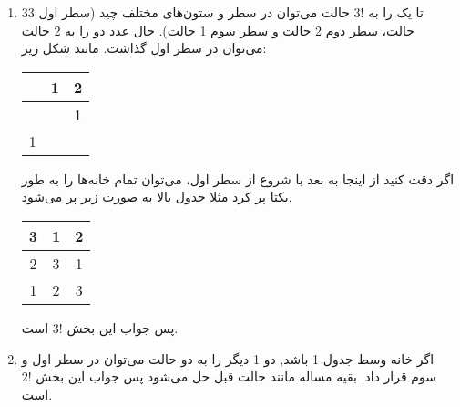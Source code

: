 \begin{enumerate}
    \item
        3تا یک را به 
	$3!$
	حالت می‌توان در سطر و ستون‌های مختلف چید
	(سطر اول 3 حالت، سطر دوم 2 حالت و سطر سوم 1 حالت).
	حال عدد دو را به 2 حالت می‌توان در سطر اول گذاشت. مانند شکل زیر:
	
	 \begin{center}
	\begin{tabular}{ |c|c|c| } 
     \hline
       & 1 & 2  \\ 
     \hline
       &   & 1 \\ 
     \hline
     1 &  &   \\ 
     \hline
    \end{tabular}
    \end{center}
    اگر دقت کنید از اینجا به بعد با شروع از سطر اول، می‌توان تمام خانه‌ها را به طور یکتا پر کرد مثلا جدول بالا به صورت زیر پر می‌شود.
    
    \begin{center}
	\begin{tabular}{ |c|c|c| } 
     \hline
      3 & 1 & 2 \\ 
     \hline
      2 & 3 & 1 \\ 
     \hline
      1 & 2 & 3 \\ 
     \hline
    \end{tabular}
    \end{center}
    پس جواب این بخش
    $3!$ 
    است.
    
    \item
    اگر خانه وسط جدول 1 باشد, دو 1 دیگر را به دو حالت می‌توان در سطر اول و سوم قرار داد. بقیه مساله مانند حالت قبل حل می‌شود پس جواب این بخش 
    $2!$ است.
    \end{enumerate}